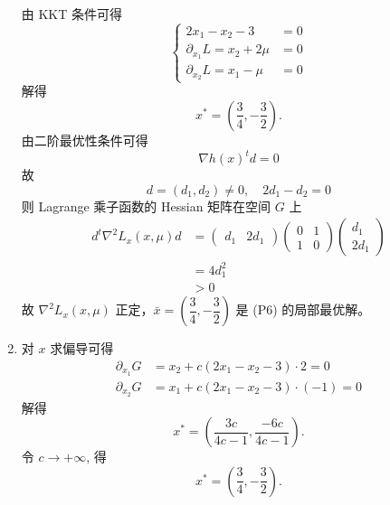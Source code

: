 \begin{Problem}
\begin{enumerate}[label=(\arabic*)]
        由 KKT 条件可得 
        \[
            \begin{cases}
                2x_1 - x_2 - 3 &= 0\\
                \partial_{x_1}L = x_2 + 2\mu &= 0\\
                \partial_{x_2}L = x_1 - \mu &= 0
            \end{cases}
        \]
        解得
        \[
            x^* = \left(\dfrac{3}{4}, -\dfrac{3}{2}\right).
        \]
        由二阶最优性条件可得 
        \[
            \nabla h(x)^td = 0
        \]
        故
        \[
            d = \left(d_1, d_2\right) \neq 0,\quad 2d_1 - d_2 = 0
        \]
        则 Lagrange 乘子函数的 Hessian 矩阵在空间 $G$ 上 
        \begin{align*}
            d^t\nabla^2L_x(x, \mu)d &= \begin{pmatrix}
                d_1 & 2d_1
            \end{pmatrix}\begin{pmatrix}
                0 & 1 \\ 1 & 0
            \end{pmatrix}\begin{pmatrix}
                d_1 \\ 2d_1
            \end{pmatrix}\\
            &= 4d_1^2\\
            &> 0
        \end{align*}
        故 $\nabla^2L_x(x, \mu)$ 正定，$\bar{x} = \left(\dfrac{3}{4}, -\dfrac{3}{2}\right)$ 是 (P6) 的局部最优解。
        \item 对 $x$ 求偏导可得 
        \begin{align*}
            \partial_{x_1}G &= x_2 + c(2x_1 - x_2 - 3) \cdot 2 = 0\\
            \partial_{x_2}G &= x_1 + c(2x_1 - x_2 - 3) \cdot (-1) = 0
        \end{align*}
        解得 
        \[
            x^* = \left(\dfrac{3c}{4c - 1}, \dfrac{-6c}{4c - 1}\right).
        \]
        令 $c \to +\infty$, 得
        \[
            x^* = \left(\dfrac{3}{4}, -\dfrac{3}{2}\right).
        \]
    \end{enumerate}
\end{Problem}

